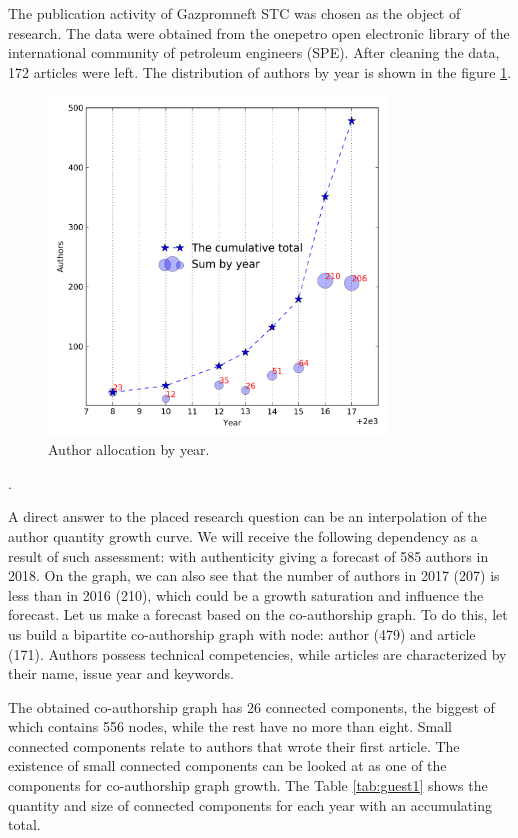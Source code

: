 \documentclass[12pt]{report}
\theoremstyle{definition}
\begin{document}
The publication activity of  Gazpromneft STC was chosen as the object of research. 
The data were obtained from the onepetro open electronic library of the international community of petroleum engineers (SPE). 
After cleaning the data, 172 articles were left. 
The distribution of authors by year is shown in the figure \ref{fig:guest2}.

\begin{figure}[ht]
	\centering
	\includegraphics[width=0.8\textwidth]{guest2eng}
	\caption{Author allocation by year.}
	\label{fig:guest2}
\end{figure}  .

A direct answer to the placed research question can be an interpolation of the author quantity growth curve. We will receive the following dependency as a result of such assessment: with authenticity giving a forecast of 585 authors in 2018. On the graph, we can also see that the number of authors in 2017 (207) is less than in 2016 (210), which could be a growth saturation and influence the forecast.
Let us make a forecast based on the co-authorship graph. To do this, let us build a bipartite co-authorship graph \cite{krasnov2018bi} with node: author (479) and article (171). Authors possess technical competencies, while articles are characterized by their name, issue year and keywords. 

The obtained co-authorship graph has 26 connected components, the biggest of which contains 556 nodes, while the rest have no more than eight. Small connected components relate to authors that wrote their first article. The existence of small connected components can be looked at as one of the components for co-authorship graph growth. The Table \ref{tab:guest1} shows the quantity and size of connected components for each year with an accumulating total. 
\end{document}
